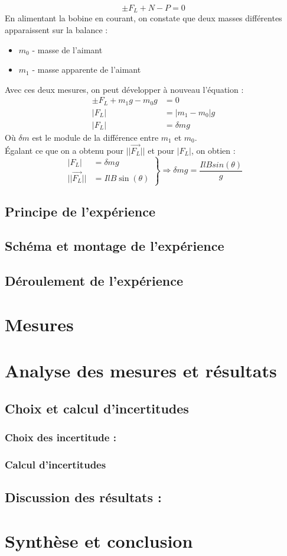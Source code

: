 \documentclass[12pt,a4paper]{article}
\begin{document}
    \begin{equation*}
        \pm F_L + N - P = 0
    \end{equation*}
    En alimentant la bobine en courant, on constate que deux masses différentes apparaissent sur la balance :
    \begin{itemize}
        \item $m_0$ - masse de l'aimant
        \item $m_1$ - masse apparente de l'aimant
    \end{itemize}
    Avec ces deux mesures, on peut développer à nouveau l'équation :
    \begin{align*}
        \pm F_L + m_1g - m_0g &= 0 \\
        |F_L| &= |m_1 - m_0|g \\
        |F_L| &= \delta m g
    \end{align*}
    Où $\delta m$ est le module de la différence entre $m_1$ et $m_0$. \\
    Égalant ce que on a obtenu pour $||\vec{F_L}||$ et pour $|F_L|$, on obtien :
    \begin{equation*}
        \left.
        \begin{aligned}
            |F_L| &= \delta mg \\
            ||\vec{F_L}|| &= IlB\sin(\theta)
        \end{aligned}
        \right\}
        \Rightarrow
        \delta mg = \frac{IlBsin(\theta)}{g}
    \end{equation*}

    \subsection{Principe de l'expérience}
    \subsection{Schéma et montage de l’expérience}
    \subsection{Déroulement de l'expérience}
    \section{Mesures}
    \section{Analyse des mesures et résultats}
    \subsection{Choix et calcul d'incertitudes}
    \subsubsection{Choix des incertitude :}
    \subsubsection{Calcul d'incertitudes}
    \subsection{Discussion des résultats :}
    \section{Synthèse et conclusion}
\end{document}
